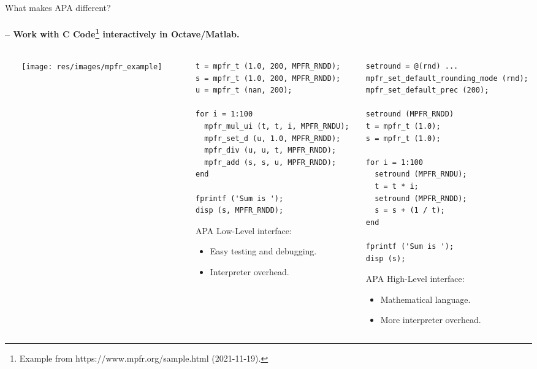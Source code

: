 \begin{frame}[fragile]{What makes APA different?}
\framesubtitle{-- Work with C Code\footnote{Example
from https://www.mpfr.org/sample.html (2021-11-19).}
interactively in Octave/Matlab.}

\begin{columns}
\begin{column}[T]{0.01\textwidth}
\end{column}
\begin{column}[T]{0.3\textwidth}
\texttt{[image: res/images/mpfr\_example]}
\end{column}
\begin{column}[T]{0.01\textwidth}
\end{column}
\begin{column}[T]{0.38\textwidth}
\begin{lstlisting}[basicstyle=\tiny,
  columns=fullflexible,
  upquote=true,]
t = mpfr_t (1.0, 200, MPFR_RNDD);
s = mpfr_t (1.0, 200, MPFR_RNDD);
u = mpfr_t (nan, 200);

for i = 1:100
  mpfr_mul_ui (t, t, i, MPFR_RNDU);
  mpfr_set_d (u, 1.0, MPFR_RNDD);
  mpfr_div (u, u, t, MPFR_RNDD);
  mpfr_add (s, s, u, MPFR_RNDD);
end

fprintf ('Sum is ');
disp (s, MPFR_RNDD);
\end{lstlisting}

\bigskip

APA {\color{blue}Low-Level} interface:
\begin{itemize}
\item
Easy testing and debugging.

\item
Interpreter overhead.
\end{itemize}

\end{column}
\begin{column}[T]{0.4\textwidth}

\vspace*{-1cm}
\begin{lstlisting}[basicstyle=\tiny,
  columns=fullflexible,
  upquote=true,]
setround = @(rnd) ...
mpfr_set_default_rounding_mode (rnd);
mpfr_set_default_prec (200);

setround (MPFR_RNDD)
t = mpfr_t (1.0);
s = mpfr_t (1.0);

for i = 1:100
  setround (MPFR_RNDU);
  t = t * i;
  setround (MPFR_RNDD);
  s = s + (1 / t);
end

fprintf ('Sum is ');
disp (s);
\end{lstlisting}

\bigskip

APA {\color{blue}High-Level} interface:
\begin{itemize}
\item
Mathematical language.

\item
More interpreter overhead.
\end{itemize}

\end{column}
\end{columns}

\end{frame}


